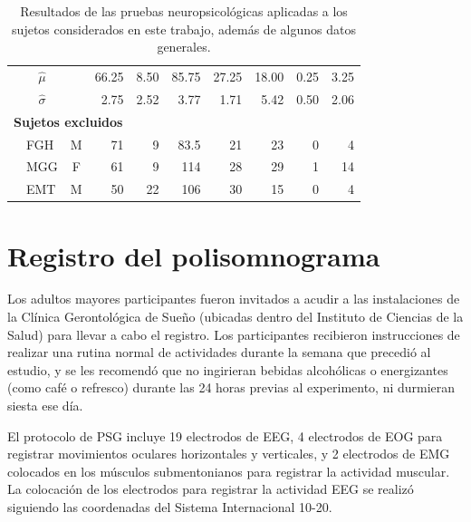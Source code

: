 \documentclass[12pt,a4paper]{mitthesis}
\begin{document}
\begin{table}
\begin{small}
\begin{tabular}{llcrrrrrrr}
\rowcolor{gris}
&\multicolumn{1}{c}{$\widehat{\mu}$} & 
              & 66.25& 8.50 & 85.75   & 27.25& 18.00& 0.25 & 3.25\\
\rowcolor{gris}
&\multicolumn{1}{c}{$\widehat{\sigma}$} & 
              & 2.75 & 2.52 & 3.77    & 1.71 & 5.42 & 0.50 & 2.06\\
\midrule
\multicolumn{6}{l}{\textbf{Sujetos excluidos}}\\
&FGH    & M    & 71   & 9    & 83.5     & 21   & 23   & 0    & 4  \\
&MGG    & F    & 61   & 9    & 114      & 28   & 29   & 1    & 14 \\
&EMT    & M    & 50   & 22   & 106      & 30   & 15   & 0    & 4  \\
\bottomrule
\end{tabular} 
\end{small}
\label{tab_sujetos}
\caption{Resultados de las pruebas neuropsicol\'ogicas aplicadas a los sujetos considerados en este 
trabajo, adem\'as de algunos datos generales. 
}
\end{table}


\section{Registro del polisomnograma}

Los adultos mayores participantes fueron invitados a acudir a las instalaciones de la Cl\'inica 
Gerontol\'ogica de Sue\~no (ubicadas dentro del Instituto de Ciencias de la Salud) para llevar a 
cabo el registro. Los participantes recibieron instrucciones de realizar una rutina normal de 
actividades durante la semana que precedi\'o al estudio, y se les recomend\'o que no ingirieran 
bebidas alcoh\'olicas o energizantes (como caf\'e o refresco) durante las 24 horas previas al 
experimento, ni durmieran siesta ese d\'ia.

El protocolo de PSG incluye 19 electrodos de EEG, 4 electrodos de EOG para registrar movimientos 
oculares horizontales y verticales, y 2 electrodos de EMG colocados en los m\'usculos 
submentonianos para registrar la actividad muscular. 
La colocaci\'on de los electrodos para registrar la actividad EEG se realiz\'o siguiendo las 
coordenadas del Sistema Internacional 10-20\cite{Coleman87}.
\end{document}
